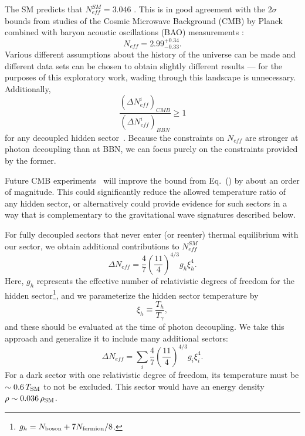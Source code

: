 \documentclass[nofootinbib,twocolumn,preprintnumbers]{revtex4-1}
\begin{document}
The SM predicts that $N^{SM}_{eff} = 3.046$ \cite{Mangano:2005cc}. This is in good agreement with the $2\sigma$ bounds from studies of the Cosmic Microwave Background (CMB) by Planck combined with baryon acoustic oscillations (BAO) measurements \cite{Aghanim:2018eyx}:
\begin{equation}\label{eqn:NeffBounds}
N_{eff} = 2.99^{+0.34}_{-0.33}.
\end{equation}
Various different assumptions about the history of the universe can be made and different data sets can be chosen to obtain slightly different results \cite{Breitbach:2018ddu} --- for the purposes of this exploratory work, wading through this landscape is unnecessary. Additionally, 
\begin{equation}
\frac{(\Delta N^i_{eff})_{CMB}}{(\Delta N^i_{eff})_{BBN}} \geq 1
\end{equation}
for any  decoupled hidden sector~\cite{Arkani-Hamed:2016rle}. Because the constraints on $N_{eff}$ are stronger at photon decoupling than at BBN, we can focus purely on the constraints provided by the former.

Future CMB experiments~\cite{} will improve the bound from Eq.~(\label{eqn:NeffBounds}) by about an order of magnitude. This could significantly reduce the allowed temperature ratio of any hidden sector, or alternatively could provide evidence for such sectors in a way that is complementary to the gravitational wave signatures described below. 

For fully decoupled sectors that never enter (or reenter) thermal equilibrium with our sector, we obtain additional contributions to $N^{SM}_{eff}$ \cite{Breitbach:2018ddu}
\begin{equation}\label{eqn:DeltaNeff1hs}
\Delta N_{eff} = \frac{4}{7}\left(\frac{11}{4}\right)^{4/3}g_h \xi_h^4.
\end{equation} 
Here, $g_h$ represents the effective number of relativistic degrees of freedom for the hidden sector\footnote{$g_h = N_{\rm boson} + 7 N_{\rm fermion}/8$.}, and we parameterize the hidden sector temperature by~\cite{Breitbach:2018ddu}
\begin{equation}
\xi_h \equiv  \frac{T_{h}}{T_{\gamma}},
\label{eq:xi}
\end{equation}
and these should be evaluated at the time of photon decoupling. 
%
%
We take this approach and generalize it to include many additional sectors:
\begin{equation}\label{eqn:DeltaNeff}
\Delta N_{eff} = \sum_i \frac{4}{7}\left(\frac{11}{4}\right)^{4/3}g_{i} \xi^4_{i}.
\end{equation} 
For a dark sector with one relativistic degree of freedom, its temperature must be $\sim 0.6\, T_{\rm SM}$ to not be excluded. This sector would have an energy density $\rho \sim 0.036\, \rho_{\rm SM}$. 
\end{document}
